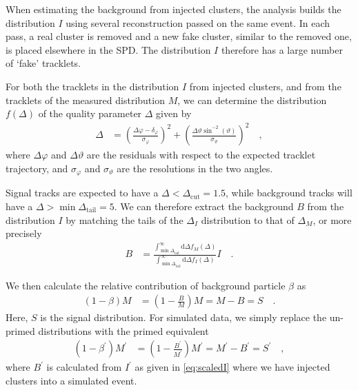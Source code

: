 \documentclass{article}
\begin{document}
When estimating the background from injected clusters, the analysis
builds the distribution $I$ using several reconstruction passed on the
same event.  In each pass, a real cluster is removed and a new fake
cluster, similar to the removed one, is placed elsewhere in the SPD.
The distribution $I$ therefore has a large number of `fake'
tracklets.  

For both the tracklets in the distribution $I$ from injected clusters,
and from the tracklets of the measured distribution $M$, we can
determine the distribution $f(\Delta)$ of the quality parameter
$\Delta$ given by  
\begin{align}
  \label{eq:Delta}
  \Delta 
  &= 
    \left(\frac{\Delta\varphi-\delta_{\varphi}}{\sigma_{\varphi}}\right)^2+
    \left(\frac{\Delta\vartheta\sin^{-2}(\vartheta)}{\sigma_{\vartheta}}\right)^2
    \quad,
\end{align}
where $\Delta\varphi$ and $\Delta\vartheta$ are the residuals with
respect to the expected tracklet trajectory, and $\sigma_{\varphi}$
and $\sigma_{\vartheta}$ are the resolutions in the two angles. 

Signal tracks are expected to have a
$\Delta<\Delta_{\mathrm{cut}}=1.5$, while background tracks will have
a $\Delta>\min\Delta_{\mathrm{tail}}=5$.  We can therefore extract the
background $B$ from the distribution $I$ by matching the tails of the
$\Delta_I$ distribution to that of $\Delta_M$, or more precisely 
\begin{align}
  \label{eq:scaledI}
  B 
  &= \frac{\int_{\min\Delta_{\mathrm{tail}}}^{\infty}\mathrm{d}\Delta
    f_M(\Delta)}{
    \int_{\min\Delta_{\mathrm{tail}}}^{\infty}\mathrm{d}\Delta
    f_I(\Delta)}I\quad.
\end{align}

We then calculate the relative contribution of background particle
$\beta$ as 
\begin{align}
  \label{eq:betaI}
  (1-\beta)M &= \left(1-\frac{B}{M}\right)M = M-B = S\quad.
\end{align}
Here, $S$ is the signal distribution.  For simulated data, we simply
replace the un-primed distributions with the primed equivalent
\begin{align*}
  (1-\beta^\prime)M^\prime 
  &=
    \left(1-\frac{B^\prime}{M^\prime}\right)M^\prime 
    = M^\prime-B^\prime = S^\prime\quad,
\end{align*}
where $B^\prime$ is calculated from $I^\prime$ as given in
\eqref{eq:scaledI} where we have injected clusters into a simulated
event. 
\end{document}

